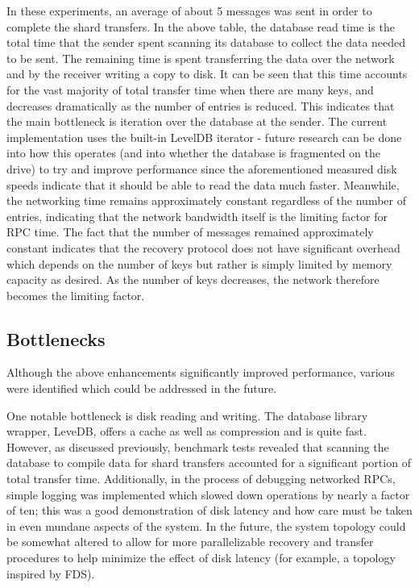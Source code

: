 \documentclass[letterpaper,10pt]{article}
\begin{document}
In these experiments, an average of about 5 messages was sent in order to complete the shard transfers.  In the above table, the database read time is the total time that the sender spent scanning its database to collect the data needed to be sent.  The remaining time is spent transferring the data over the network and by the receiver writing a copy to disk.  It can be seen that this time accounts for the vast majority of total transfer time when there are many keys, and decreases dramatically as the number of entries is reduced.  This indicates that the main bottleneck is iteration over the database at the sender.  The current implementation uses the built-in LevelDB iterator - future research can be done into how this operates (and into whether the database is fragmented on the drive) to try and improve performance since the aforementioned measured disk speeds indicate that it should be able to read the data much faster.  Meanwhile, the networking time remains approximately constant regardless of the number of entries, indicating that the network bandwidth itself is the limiting factor for RPC time.  The fact that the number of messages remained approximately constant indicates that the recovery protocol does not have significant overhead which depends on the number of keys but rather is simply limited by memory capacity as desired.  As the number of keys decreases, the network therefore becomes the limiting factor.




\subsection{Bottlenecks}
Although the above enhancements significantly improved performance, various were identified which could be addressed in the future.

One notable bottleneck is disk reading and writing.  The database library wrapper, LeveDB, offers a cache as well as compression and is quite fast.  However, as discussed previously, benchmark tests revealed that scanning the database to compile data for shard transfers accounted for a significant portion of total transfer time.  Additionally, in the process of debugging networked RPCs, simple logging was implemented which slowed down operations by nearly a factor of ten; this was a good demonstration of disk latency and how care must be taken in even mundane aspects of the system.  In the future, the system topology could be somewhat altered to allow for more parallelizable recovery and transfer procedures to help minimize the effect of disk latency (for example, a topology inspired by FDS).
\end{document}
